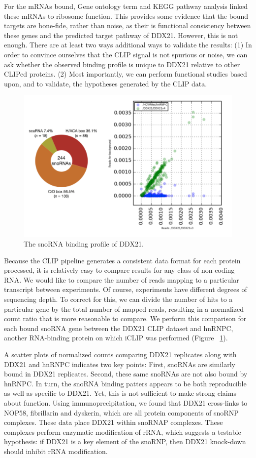 For the mRNAs bound, Gene ontology term and KEGG pathway analysis linked these mRNAs to ribosome function. This provides some evidence that the bound targets are bone-fide, rather than noise, as their is functional consistency between these genes and the predicted target pathway of DDX21. However, this is not enough. There are at least two ways additional ways to validate the results: (1) In order to convince ourselves that the CLIP signal is not spurious or noise, we can ask whether the observed binding profile is unique to DDX21 relative to other CLIPed proteins. (2) Most importantly, we can perform functional studies based upon, and to validate, the hypotheses generated by the CLIP data.

\begin{figure}
\center\includegraphics[width=120mm,scale=0.5]{Figures/Fig17}
\caption{The snoRNA binding profile of DDX21.}
\label{fig:Fig17}
\end{figure}

Because the CLIP pipeline generates a consistent data format for each protein processed, it is relatively easy to compare results for any class of non-coding RNA. We would like to compare the number of reads mapping to a particular transcript between experiments. Of course, experiments have different degrees of sequencing depth. To correct for this, we can divide the number of hits to a particular gene by the total number of mapped reads, resulting in a normalized count ratio that is more reasonable to compare. We perform this comparison for each bound snoRNA gene between the DDX21 CLIP dataset and hnRNPC, another RNA-binding protein on which iCLIP was performed \cite{Zarnack:2013iv} (Figure ~\ref{fig:Fig17}).

A scatter plots of normalized counts comparing DDX21 replicates along with DDX21 and hnRNPC indicates two key points: First, snoRNAs are similarly bound in DDX21 replicates. Second, these same snoRNAs are not also bound by hnRNPC. In turn, the snoRNA binding patters appears to be both reproducible as well as specific to DDX21. Yet, this is not sufficient to make strong claims about function. Using immunoprecipitation, we found that DDX21 cross-links to NOP58, fibrillarin and dyskerin, which are all protein components of snoRNP complexes. These data place DDX21 within snoRNAP complexes. These complexes perform enzymatic modification of rRNA, which suggests a testable hypothesis: if DDX21 is a key element of the snoRNP, then DDX21 knock-down should inhibit rRNA modification.

